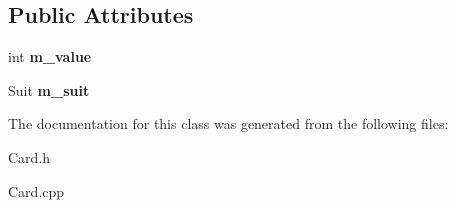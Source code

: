 \subsection*{Public Attributes}
\begin{DoxyCompactItemize}
\item 
int {\bfseries m\+\_\+value}\hypertarget{class_card_a232ecb6ad51aa9684917af229a42988e}{}\label{class_card_a232ecb6ad51aa9684917af229a42988e}

\item 
Suit {\bfseries m\+\_\+suit}\hypertarget{class_card_a5eafb96c143a0010ce5ca155182a0b56}{}\label{class_card_a5eafb96c143a0010ce5ca155182a0b56}

\end{DoxyCompactItemize}


The documentation for this class was generated from the following files\+:\begin{DoxyCompactItemize}
\item 
Card.\+h\item 
Card.\+cpp\end{DoxyCompactItemize}
